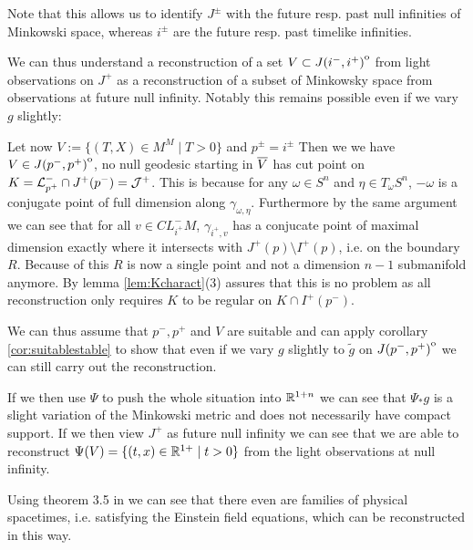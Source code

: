 Note that this allows us to identify $J^\pm$ with the future resp. past null infinities of Minkowski space, whereas $i^\pm$ are the future resp. past timelike infinities.

We can thus understand a reconstruction of a set $V\subset {\kern0ptJ(i^-,i^+)}^{\mathrm{o}}$ from light observations on $J^+$ as a reconstruction of a subset of Minkowsky space from observations at future null infinity. Notably this remains possible even if we vary $g$ slightly:
\begin{example}Let now $V:= \{(T,X)\in M^M \mid T>0\}$ and $p^\pm = i^\pm$ Then we we have $V\in {\kern0ptJ(p^-,p^+)}^{\mathrm{o}}$, no null geodesic starting in ${\overline{V}}$ has cut point on $K={\mathcal{L}}^-_{p^+}\cap J^+(p^-) = {\mathcal{J}}^+$. This is because for any $\omega \in S^n$ and $\eta\in T_\omega S^n$, $-\omega$ is a conjugate point of full dimension along $\gamma_{\omega,\eta}$. Furthermore by the same argument we can see that for all $v\in CL^-_{i^+}M$, $\gamma_{i^+,v}$ has a conjucate point of maximal dimension exactly where it intersects with $J^+(p)\setminus I^+(p)$, i.e. on the boundary $R$. Because of this $R$ is now a single point and not a dimension $n-1$ submanifold anymore. By lemma \ref{lem:Kcharact}(3) assures that this is no problem as all reconstruction only requires $K$ to be regular on $K\cap I^+(p^-)$.

We can thus assume that $p^-,p^+$ and $V$ are suitable and can apply corollary \ref{cor:suitablestable} to show that even if we vary $g$ slightly to $\widetilde{g}$ on ${\kern0ptJ(p^-,p^+)}^{\mathrm{o}}$ we can still carry out the reconstruction. 

If we then use $\Psi$ to push the whole situation into $\mathbb{R}^{1+n}$ we can see that $\Psi_*g$ is a slight variation of the Minkowski metric and does not necessarily have compact support. If we then view $J^+$ as future null infinity we can see that we are able to reconstruct $\Psi(V) = \{(t,x)\in \mathbb{R}^{1+} \mid t>0\}$ from the light observations at null infinity.

Using theorem 3.5 in \cite{friedrichspacetime} we can see that there even are families of physical spacetimes, i.e. satisfying the Einstein field equations, which can be reconstructed in this way.
\end{example}
